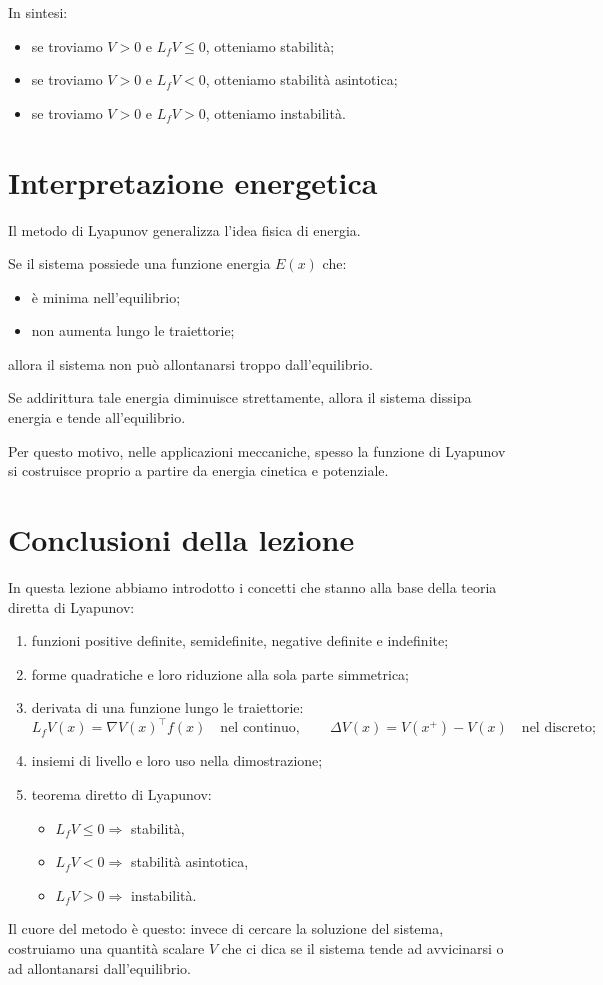 In sintesi:
\begin{itemize}
    \item se troviamo \(V>0\) e \(L_fV\le 0\), otteniamo stabilità;
    \item se troviamo \(V>0\) e \(L_fV<0\), otteniamo stabilità asintotica;
    \item se troviamo \(V>0\) e \(L_fV>0\), otteniamo instabilità.
\end{itemize}

\section{Interpretazione energetica}

Il metodo di Lyapunov generalizza l'idea fisica di energia.

Se il sistema possiede una funzione energia \(E(x)\) che:
\begin{itemize}
    \item è minima nell'equilibrio;
    \item non aumenta lungo le traiettorie;
\end{itemize}
allora il sistema non può allontanarsi troppo dall'equilibrio.

Se addirittura tale energia diminuisce strettamente, allora il sistema dissipa energia e tende all'equilibrio.

\medskip

\noindent
Per questo motivo, nelle applicazioni meccaniche, spesso la funzione di Lyapunov si costruisce proprio a partire da energia cinetica e potenziale.

\section{Conclusioni della lezione}

In questa lezione abbiamo introdotto i concetti che stanno alla base della teoria diretta di Lyapunov:

\begin{enumerate}
    \item funzioni positive definite, semidefinite, negative definite e indefinite;
    \item forme quadratiche e loro riduzione alla sola parte simmetrica;
    \item derivata di una funzione lungo le traiettorie:
    \[
    L_fV(x)=\nabla V(x)^\top f(x)
    \quad \text{nel continuo},
    \qquad
    \Delta V(x)=V(x^+)-V(x)
    \quad \text{nel discreto};
    \]
    \item insiemi di livello e loro uso nella dimostrazione;
    \item teorema diretto di Lyapunov:
    \begin{itemize}
        \item \(L_fV\le 0 \Rightarrow\) stabilità,
        \item \(L_fV<0 \Rightarrow\) stabilità asintotica,
        \item \(L_fV>0 \Rightarrow\) instabilità.
    \end{itemize}
\end{enumerate}

Il cuore del metodo è questo: invece di cercare la soluzione del sistema, costruiamo una quantità scalare \(V\) che ci dica se il sistema tende ad avvicinarsi o ad allontanarsi dall'equilibrio.
